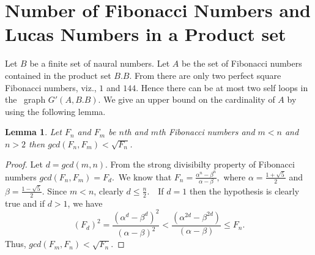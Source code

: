 \documentclass{amsart}
\newtheorem{Lemma 1}{Lemma}[section]
\newtheorem{Lemma 3}[Lemma 1]{Lemma}
\newtheorem{Lucas The}[Lemma 1]{Theorem}
\newtheorem{lem 1}[Lemma 1]{Lemma}
\newtheorem{Corollary 1}[Lemma 1]{Corollary}
\newtheorem{Corollary 2}[Lemma 1]{Corollary}
\begin{document}
	\section{Number of Fibonacci Numbers and Lucas Numbers in a Product set}
	Let $B$ be a finite set of naural numbers. Let $A$ be the set of Fibonacci numbers contained in the product set $B.B$. From \cite{C} there are only two perfect square Fibonacci numbers, viz., $1$ and $144$. Hence there can be at most two self loops in the  graph $G'(A,B.B)$. We give an upper bound on the cardinality of $A$ by using the following lemma.
	\begin{Lemma 1}\label{Lemma}Let $F_n$ and $F_m$ be $n$th and $m$th Fibonacci numbers and $m<n$ and $n>2$ then $gcd(F_n,F_m)<\sqrt{F_n}$.\end{Lemma 1}\begin{proof}Let $d=gcd(m,n)$. From the strong divisibilty property of Fibonacci numbers $gcd(F_n,F_m)=F_{d}$. We know that $F_n=\frac{\alpha^n-\beta^n}{\alpha-\beta},$ where $\alpha=\frac{1+\sqrt{5}}{2}$ and $\beta=\frac{1-\sqrt{5}}{2}$. Since $m<n$, clearly $d\leq \frac{n}{2}$.  If $d=1$ then the hypothesis is clearly true and if $d>1$, we have\begin{equation*}(F_d)^2=\frac{(\alpha^d-\beta^d)^2}{(\alpha-\beta)^2}< \frac{(\alpha^{2d}-\beta^{2d})}{(\alpha-\beta)}\leq F_n.\end{equation*}Thus, $gcd(F_m,F_n)<\sqrt{F_n}$.\end{proof}
\end{document}
